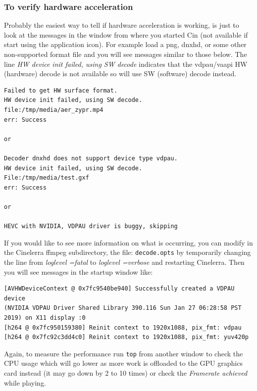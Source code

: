 \subsubsection*{To verify hardware acceleration}%
\label{ssub:verify_hardware_acceleration}

Probably the easiest way to tell if hardware acceleration is working, is just to look at the messages in the window from where you started Cin (not available if start using the application icon).  For example load a png, dnxhd, or some other non-supported format file and you will see messages similar to those below.  The line \textit{HW device init failed, using SW decode} indicates that the vdpau/vaapi HW (hardware) decode is not available so will use SW (software) decode instead.

\begin{lstlisting}[numbers=none]
Failed to get HW surface format.
HW device init failed, using SW decode.
file:/tmp/media/aer_zypr.mp4
err: Success

or

Decoder dnxhd does not support device type vdpau.
HW device init failed, using SW decode.
File:/tmp/media/test.gxf
err: Success

or

HEVC with NVIDIA, VDPAU driver is buggy, skipping
\end{lstlisting}

If you would like to see more information on what is occurring, you can modify in the Cinelerra ffmpeg subdirectory, the file:  \texttt{decode.opts}   by temporarily changing the line from \textit{loglevel =fatal} to \textit{loglevel =verbose} and restarting Cinelerra.  Then you will see messages in the startup window like:

\begin{lstlisting}[numbers=none]
[AVHWDeviceContext @ 0x7fc9540be940] Successfully created a VDPAU device 
(NVIDIA VDPAU Driver Shared Library 390.116 Sun Jan 27 06:28:58 PST 2019) on X11 display :0
[h264 @ 0x7fc950159380] Reinit context to 1920x1088, pix_fmt: vdpau
[h264 @ 0x7fc92c3dd4c0] Reinit context to 1920x1088, pix_fmt: yuv420p
\end{lstlisting}

Again, to measure the performance run \texttt{top} from another window to check the CPU usage which will go lower as more work is offloaded to the GPU graphics card instead (it may go down by 2 to 10 times) or check the \textit{Framerate achieved} while playing.


